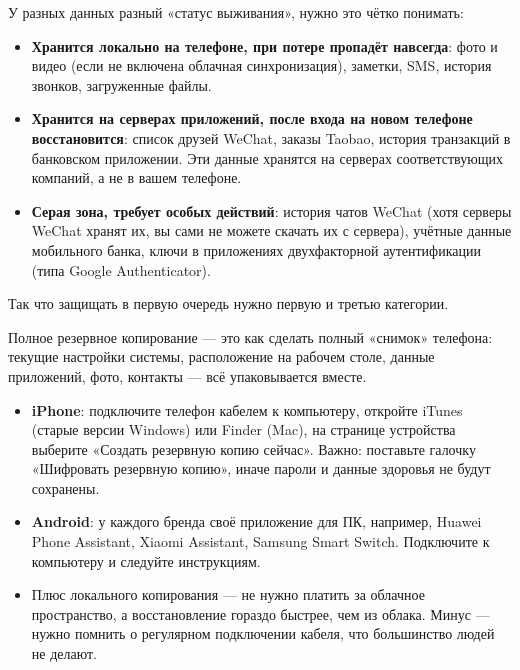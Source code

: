 


У разных данных разный «статус выживания», нужно это чётко понимать:

\begin{itemize}
  \item \textbf{Хранится локально на телефоне, при потере пропадёт навсегда}: фото и видео (если не включена облачная синхронизация), заметки, SMS, история звонков, загруженные файлы.
  \item \textbf{Хранится на серверах приложений, после входа на новом телефоне восстановится}: список друзей WeChat, заказы Taobao, история транзакций в банковском приложении. Эти данные хранятся на серверах соответствующих компаний, а не в вашем телефоне.
  \item \textbf{Серая зона, требует особых действий}: история чатов WeChat (хотя серверы WeChat хранят их, вы сами не можете скачать их с сервера), учётные данные мобильного банка, ключи в приложениях двухфакторной аутентификации (типа Google Authenticator).
\end{itemize}

Так что защищать в первую очередь нужно первую и третью категории.


Полное резервное копирование — это как сделать полный «снимок» телефона: текущие настройки системы, расположение на рабочем столе, данные приложений, фото, контакты — всё упаковывается вместе.


\begin{itemize}
  \item \textbf{iPhone}: подключите телефон кабелем к компьютеру, откройте iTunes (старые версии Windows) или Finder (Mac), на странице устройства выберите «Создать резервную копию сейчас». Важно: поставьте галочку «Шифровать резервную копию», иначе пароли и данные здоровья не будут сохранены.
  \item \textbf{Android}: у каждого бренда своё приложение для ПК, например, Huawei Phone Assistant, Xiaomi Assistant, Samsung Smart Switch. Подключите к компьютеру и следуйте инструкциям.
  \item Плюс локального копирования — не нужно платить за облачное пространство, а восстановление гораздо быстрее, чем из облака. Минус — нужно помнить о регулярном подключении кабеля, что большинство людей не делают.
\end{itemize}

